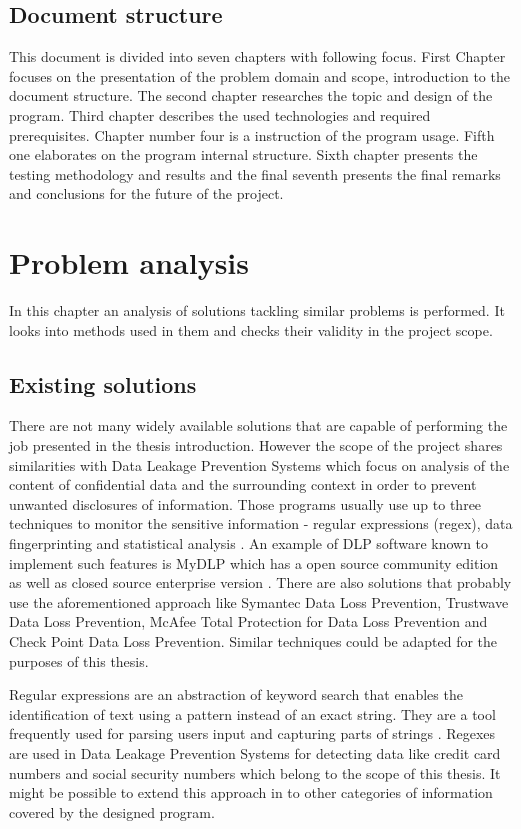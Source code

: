 \documentclass[a4paper,twoside,12pt]{book}
\begin{document}
\section{Document structure}

This document is divided into seven chapters with following focus. First Chapter focuses on the presentation of the problem domain and scope, introduction to the document structure. 
The second chapter researches the topic and design of the program. Third chapter describes the used technologies and required prerequisites. Chapter number four is a instruction of the program usage.
Fifth one elaborates on the program internal structure. Sixth chapter presents the testing methodology and results and the final seventh presents the final remarks and conclusions for the future of the project.

\chapter{Problem analysis}

In this chapter an analysis of solutions tackling similar problems is performed. It looks into methods used in them and checks their validity in the project scope.

\section{Existing solutions}

There are not many widely available solutions that are capable of performing the job presented in the thesis introduction. However the scope of the project shares
similarities with Data Leakage Prevention Systems which focus on analysis of the content of confidential data and the surrounding context in order to
prevent unwanted disclosures of information. Those programs usually use up to three techniques to monitor the sensitive information - regular expressions (regex),
data fingerprinting and statistical analysis \cite{bib:articleDLPS}. An example of DLP software known to implement such features is MyDLP which has a open source
community edition as well as closed source enterprise version \cite{bib:internetDLP}. There are also solutions that probably use the aforementioned approach 
like Symantec Data Loss Prevention, Trustwave Data Loss Prevention, McAfee Total Protection for Data Loss Prevention and Check Point Data Loss Prevention.
Similar techniques could be adapted for the purposes of this thesis. 

Regular expressions are an abstraction of keyword search that enables the identification of text using a pattern instead of an exact string. They are a tool 
frequently used for parsing users input and capturing parts of strings \cite{bib:conferenceRegex}. Regexes are used in Data Leakage Prevention Systems for detecting 
data like credit card numbers and social security numbers \cite{bib:articleDLPS} which belong to the scope of this thesis. It might be possible to extend this approach 
in to other categories of information covered by the designed program.
\end{document}

